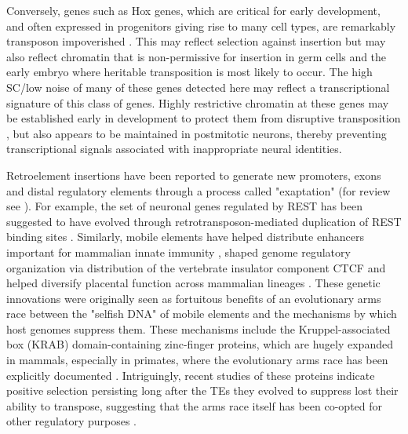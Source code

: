 Conversely, genes such as Hox genes, which are critical for early development, and often expressed in progenitors giving rise to many cell types, are remarkably transposon impoverished \citep{Chinwalla_2002,Simons_2005}. This may reflect selection against insertion but may also reflect chromatin that is non-permissive for insertion in germ cells and the early embryo where heritable transposition is most likely to occur. The high SC/low noise of many of these genes detected here may reflect a transcriptional signature of this class of genes. Highly restrictive chromatin at these genes may be established early in development to protect them from disruptive transposition \citep{Montavon_2014}, but also appears to be maintained in postmitotic neurons, thereby preventing transcriptional signals associated with inappropriate neural identities. 

Retroelement insertions have been reported to generate new promoters, exons and distal regulatory elements through a process called "exaptation" (for review see \cite{Chuong_2016}). For example, the set of neuronal genes regulated by REST has been suggested to have evolved through retrotransposon-mediated duplication of REST binding sites \cite{Johnson_2006}. Similarly, mobile elements have helped distribute enhancers important for mammalian innate immunity \cite{Chuong_2016a}, shaped genome regulatory organization via distribution of the vertebrate insulator component CTCF \cite{Schmidt_2012} and helped diversify placental function across mammalian lineages \cite{Chuong_2013}. These genetic innovations were originally seen as fortuitous benefits of an evolutionary arms race between the "selfish DNA" of mobile elements and the mechanisms by which host genomes suppress them. These mechanisms include the Kruppel-associated box (KRAB) domain-containing zinc-finger proteins, which are hugely expanded in mammals, especially in primates, where the evolutionary arms race has been explicitly documented \cite{Jacobs_2014}. Intriguingly, recent studies of these proteins indicate positive selection persisting long after the TEs they evolved to suppress lost their ability to transpose, suggesting that the arms race itself has been co-opted for other regulatory purposes \cite{Imbeault_2017}. 

